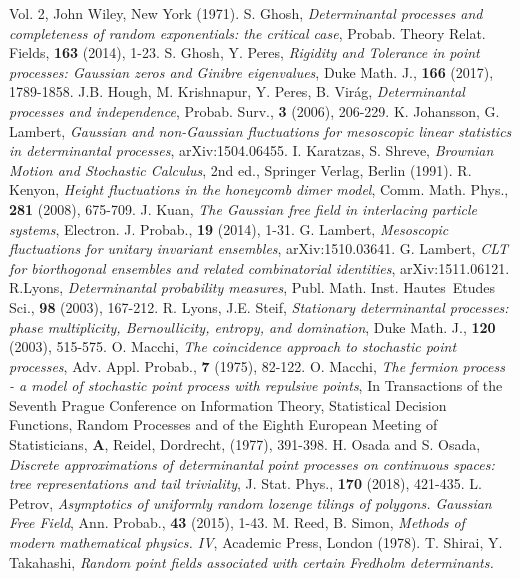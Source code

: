 \documentclass{article}
\numberwithin{equation}{section}
\begin{document}
\begin{thebibliography}{0}
Vol. 2, John Wiley, New York (1971).
 S. Ghosh, {\it Determinantal processes and completeness of random exponentials:
the critical case}, Probab. Theory Relat. Fields, {\bf 163}
(2014), 1-23.
 S. Ghosh, Y. Peres, {\it Rigidity and Tolerance in point processes: Gaussian zeros and Ginibre eigenvalues}, Duke Math. J., {\bf 166} (2017), 1789-1858.
 J.B. Hough, M. Krishnapur, Y. Peres, B. Vir\'ag,
{\it Determinantal processes and independence},
Probab. Surv., {\bf 3} (2006), 206-229.
 K. Johansson, G. Lambert,
{\it Gaussian and non-Gaussian fluctuations for mesoscopic linear statistics in determinantal processes}, arXiv:1504.06455.
 I. Karatzas,  S. Shreve, {\it Brownian Motion and Stochastic Calculus}, 2nd ed., Springer Verlag, Berlin (1991).
 R. Kenyon, {\it Height fluctuations in the honeycomb dimer model}, Comm. Math. Phys.,
{\bf 281} (2008), 675-709.
 J. Kuan, {\it The Gaussian free field in interlacing particle systems}, 
Electron. J. Probab., {\bf 19} (2014), 1-31.
 G. Lambert, {\it Mesoscopic fluctuations for unitary invariant ensembles},
arXiv:1510.03641.
 G. Lambert, {\it CLT for biorthogonal ensembles and related combinatorial identities}, arXiv:1511.06121.
 R.Lyons, {\it Determinantal probability measures}, Publ. Math. Inst. Hautes \,Etudes Sci., {\bf 98} (2003), 167-212.
 R. Lyons, J.E. Steif, {\it Stationary determinantal processes: phase multiplicity,
Bernoullicity, entropy, and domination}, Duke Math. J., {\bf 120} (2003), 515-575.
 O. Macchi, {\it The coincidence approach to stochastic point processes}, Adv. Appl. Probab., {\bf 7} (1975), 82-122.
 O. Macchi, {\it The fermion process - a model of stochastic point process with repulsive points}, In Transactions of the
    Seventh Prague Conference on Information Theory, Statistical Decision Functions, Random Processes and of the Eighth European Meeting
    of
Statisticians, {\bf A}, Reidel, Dordrecht, (1977), 391-398.
H. Osada and S. Osada,
{\it Discrete approximations of determinantal point processes on continuous spaces: tree representations and tail triviality}, J. Stat. Phys., {\bf 170} (2018), 421-435.
 L. Petrov, {\it Asymptotics of  uniformly random lozenge tilings of polygons. Gaussian Free Field}, Ann. Probab., {\bf 43} (2015), 1-43.
 M. Reed, B. Simon, {\it Methods of modern mathematical physics. IV}, Academic Press, London (1978).
 T. Shirai, Y. Takahashi, {\it Random point fields associated with certain Fredholm determinants.
}
\end{thebibliography}
\end{document}
